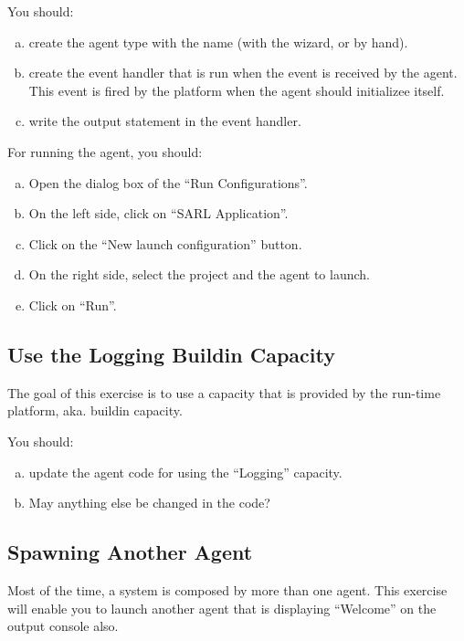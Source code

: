 \documentclass[article,english,nodocumentinfo]{multiagentfrreport}
\begin{document}
You should:
\begin{enumerate}[a)]
\item create the agent type with the name  (with the wizard, or by hand).
\item create the event handler that is run when the  event is received by the agent. This event is fired by the platform when the agent should initializee itself.
\item write the output statement in the event handler.
\end{enumerate}

For running the agent, you should:
\begin{enumerate}[a)]
\item Open the dialog box of the ``Run Configurations''.
\item On the left side, click on ``SARL Application''.
\item Click on the ``New launch configuration'' button.
\item On the right side, select the project and the agent to launch.
\item Click on ``Run''.
\end{enumerate}


\subsection{Use the Logging Buildin Capacity}

The goal of this exercise is to use a capacity that is provided by the run-time platform, aka. buildin capacity.

You should:
\begin{enumerate}[a)]
\item update the agent code for using the ``Logging'' capacity.
\item May anything else be changed in the code?
\end{enumerate}

\subsection{Spawning Another Agent}

Most of the time, a system is composed by more than one agent. This exercise will enable you to launch another agent that is displaying ``Welcome'' on the output console also.
\end{document}
